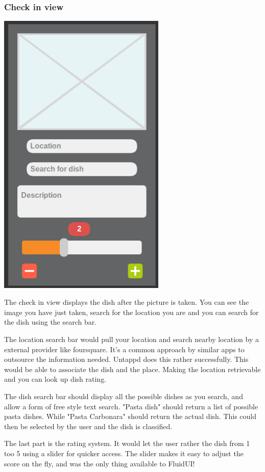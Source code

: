 \documentclass[12pt]{article}
\begin{document}
\subsubsection{Check in view}
\includegraphics[width=8cm]{pictures/prototype/checkin}
\bigbreak

The check in view displays the dish after the picture is taken. You can see the
image you have just taken, search for the location you are and you can search
for the dish using the search bar.  

The location search bar would pull your location and search nearby location by a
external provider like foursquare. It's a common approach by similar apps to
outsource the information needed. Untappd does this rather successfully. This
would be able to associate the dish and the place. Making the location
retrievable and you can look up dish rating.

The dish search bar should display all the possible dishes as you search, and
allow a form of free style text search.  "Pasta dish" should return a list of
possible pasta dishes. While "Pasta Carbonara" should return the actual dish.
This could then be selected by the user and the dish is classified.

The last part is the rating system. It would let the user rather the dish from 1
too 5 using a slider for quicker access. The slider makes it easy to adjust the
score on the fly, and was the only thing available to FluidUI!
\end{document}
